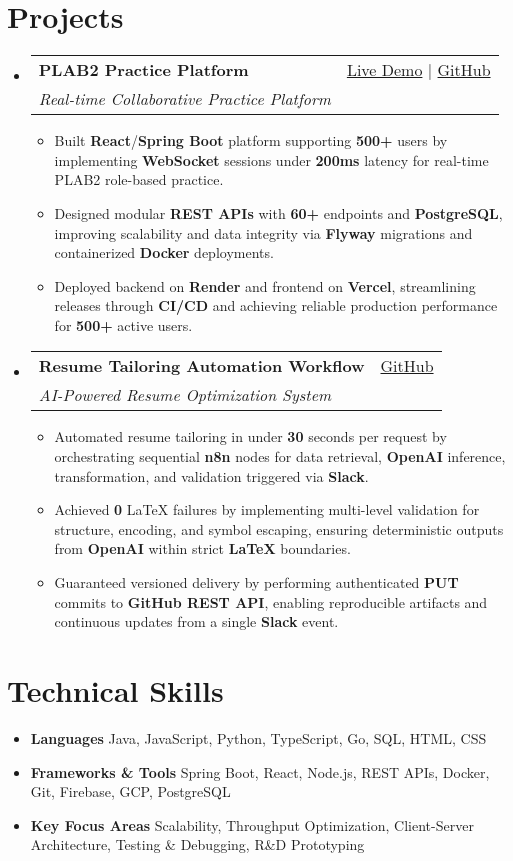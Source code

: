 \documentclass[letterpaper,11pt]{article}
\makeatletter
\newcommand{\resumeItem}[1]{\item\small{#1 \vspace{-2pt}}}
\newcommand{\resumeSubheading}[4]{
  \vspace{-1pt}\item
    \begin{tabular*}{0.97\textwidth}[t]{l@{\extracolsep{\fill}}r}
      \textbf{#1} & #2 \\
      \textit{\small#3} & \textit{\small #4} \\
    \end{tabular*}\vspace{-5pt}
}
\newcommand{\resumeSubHeadingListStart}{\begin{itemize}[leftmargin=*]}
\newcommand{\resumeSubHeadingListEnd}{\end{itemize}}
\newcommand{\resumeItemListStart}{\begin{itemize}}
\newcommand{\resumeItemListEnd}{\end{itemize}\vspace{-5pt}}
\makeatother
\begin{document}
\section{Projects}
  \resumeSubHeadingListStart
    \resumeSubheading
      {\textbf{PLAB2 Practice Platform}}{\href{https://plab2practice.com}{Live Demo} | \href{https://github.com/altansaid/plab2projectnew}{GitHub}}
      {Real-time Collaborative Practice Platform}{}
      \resumeItemListStart
        \resumeItem{Built \textbf{React}/\textbf{Spring Boot} platform supporting \textbf{500+} users by implementing \textbf{WebSocket} sessions under \textbf{200ms} latency for real-time PLAB2 role-based practice.}
        \resumeItem{Designed modular \textbf{REST APIs} with \textbf{60+} endpoints and \textbf{PostgreSQL}, improving scalability and data integrity via \textbf{Flyway} migrations and containerized \textbf{Docker} deployments.}
        \resumeItem{Deployed backend on \textbf{Render} and frontend on \textbf{Vercel}, streamlining releases through \textbf{CI/CD} and achieving reliable production performance for \textbf{500+} active users.}
      \resumeItemListEnd

    \resumeSubheading
      {\textbf{Resume Tailoring Automation Workflow}}{\href{https://github.com/altansaid/resume-automation-workflow}{GitHub}}
      {AI-Powered Resume Optimization System}{}
      \resumeItemListStart
    \resumeItem{Automated resume tailoring in under \textbf{30} seconds per request by orchestrating sequential \textbf{n8n} nodes for data retrieval, \textbf{OpenAI} inference, transformation, and validation triggered via \textbf{Slack}.}
    \resumeItem{Achieved \textbf{0} LaTeX failures by implementing multi-level validation for structure, encoding, and symbol escaping, ensuring deterministic outputs from \textbf{OpenAI} within strict \textbf{LaTeX} boundaries.}
    \resumeItem{Guaranteed versioned delivery by performing authenticated \textbf{PUT} commits to \textbf{GitHub REST API}, enabling reproducible artifacts and continuous updates from a single \textbf{Slack} event.}



      \resumeItemListEnd
  \resumeSubHeadingListEnd

\section{Technical Skills}
  \resumeItemListStart
    \resumeItem{\textbf{Languages}}{Java, JavaScript, Python, TypeScript, Go, SQL, HTML, CSS}
    \resumeItem{\textbf{Frameworks \& Tools}}{Spring Boot, React, Node.js, REST APIs, Docker, Git, Firebase, GCP, PostgreSQL}
    \resumeItem{\textbf{Key Focus Areas}}{Scalability, Throughput Optimization, Client-Server Architecture, Testing \& Debugging, R\&D Prototyping}
  \resumeItemListEnd
\end{document}
